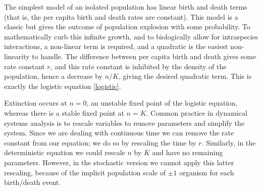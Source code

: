 The simplest model of an isolated population has linear birth and death terms (that is, the per capita birth and death rates are constant).
This model is a classic but gives the outcome of population explosion with some probability\cite{Nisbet1982}. %
To mathematically curb this infinite growth, and to biologically allow for intraspecies interactions, a non-linear term is required, and a quadratic is the easiest non-linearity to handle.
The difference between per capita birth and death gives some rate constant $r$, and this rate constant is inhibited by the density of the population, hence a decrease by $n/K$, giving the desired quadratic term.
This is exactly the logistic equation \cite{Wallace2002} \ref{logistic}.

Extinction occurs at $n=0$, an unstable fixed point of the logistic equation, whereas there is a stable fixed point at $n=K$.
Common practice in dynamical systems analysis is to rescale variables to remove parameters and simplify the system.
Since we are dealing with continuous time we can remove the rate constant from our equation; we do so by rescaling the time by $r$.
Similarly, in the deterministic equation we could rescale $n$ by $K$ and have no remaining parameters.
However, in the stochastic version we cannot apply this latter rescaling, because of the implicit population scale of $\pm1$ organism for each birth/death event. %

